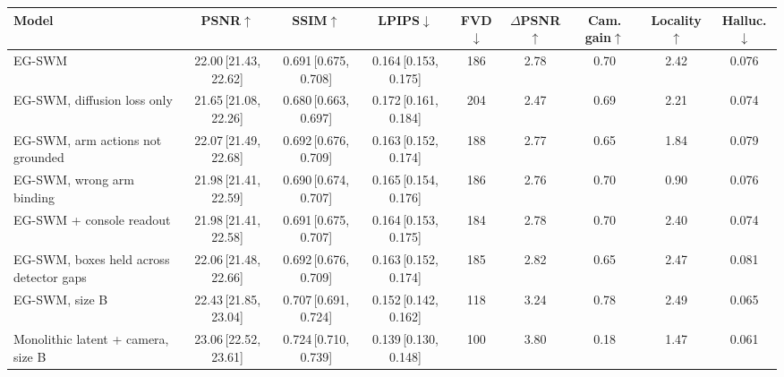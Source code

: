 \begin{tabular}{lcccccccc}
\toprule
Model & PSNR$\uparrow$ & SSIM$\uparrow$ & LPIPS$\downarrow$ & FVD$\downarrow$ & $\Delta$PSNR$\uparrow$ & Cam. gain$\uparrow$ & Locality$\uparrow$ & Halluc.$\downarrow$ \\
\midrule
EG-SWM & 22.00\,{\scriptsize[21.43, 22.62]} & 0.691\,{\scriptsize[0.675, 0.708]} & 0.164\,{\scriptsize[0.153, 0.175]} & 186 & 2.78 & 0.70 & 2.42 & 0.076 \\
EG-SWM, diffusion loss only & 21.65\,{\scriptsize[21.08, 22.26]} & 0.680\,{\scriptsize[0.663, 0.697]} & 0.172\,{\scriptsize[0.161, 0.184]} & 204 & 2.47 & 0.69 & 2.21 & 0.074 \\
EG-SWM, arm actions not grounded & 22.07\,{\scriptsize[21.49, 22.68]} & 0.692\,{\scriptsize[0.676, 0.709]} & 0.163\,{\scriptsize[0.152, 0.174]} & 188 & 2.77 & 0.65 & 1.84 & 0.079 \\
EG-SWM, wrong arm binding & 21.98\,{\scriptsize[21.41, 22.59]} & 0.690\,{\scriptsize[0.674, 0.707]} & 0.165\,{\scriptsize[0.154, 0.176]} & 186 & 2.76 & 0.70 & 0.90 & 0.076 \\
EG-SWM + console readout & 21.98\,{\scriptsize[21.41, 22.58]} & 0.691\,{\scriptsize[0.675, 0.707]} & 0.164\,{\scriptsize[0.153, 0.175]} & 184 & 2.78 & 0.70 & 2.40 & 0.074 \\
EG-SWM, boxes held across detector gaps & 22.06\,{\scriptsize[21.48, 22.66]} & 0.692\,{\scriptsize[0.676, 0.709]} & 0.163\,{\scriptsize[0.152, 0.174]} & 185 & 2.82 & 0.65 & 2.47 & 0.081 \\
EG-SWM, size B & 22.43\,{\scriptsize[21.85, 23.04]} & 0.707\,{\scriptsize[0.691, 0.724]} & 0.152\,{\scriptsize[0.142, 0.162]} & 118 & 3.24 & 0.78 & 2.49 & 0.065 \\
Monolithic latent + camera, size B & 23.06\,{\scriptsize[22.52, 23.61]} & 0.724\,{\scriptsize[0.710, 0.739]} & 0.139\,{\scriptsize[0.130, 0.148]} & 100 & 3.80 & 0.18 & 1.47 & 0.061 \\
\bottomrule
\end{tabular}
